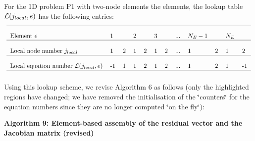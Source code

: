 For the 1\-D problem P1 with two-\/node elements the elements, the lookup table $ {\cal L}(j_{local},e)$ has the following entries\-: \[ \mbox{ \begin{tabular}{l l l l l l l l l l l l } \hline \\ \mbox{Element $e$} & 1 & & 2 & & 3 & & ... & $N_E-1$ & & $N_E$ & \\ \hline \\ \mbox{Local node number $j_{local}$} & 1 & 2 & 1 & 2 & 1 & 2 & ... & 1 & 2 & 1 & 2 \\ \hline \\ \mbox{Local equation number ${\cal L}(j_{local},e)$} & -1 & 1 & 1 & 2 & 1 & 2 & ... & 1 & 2 & 1 & -1\\ \hline \\ \end{tabular} } \] Using this lookup scheme, we revise Algorithm 6 as follows (only the highlighted regions have changed; we have removed the initialisation of the \char`\"{}counters\char`\"{} for the equation numbers since they are no longer computed \char`\"{}on the fly\char`\"{})\-:

\begin{center} {\bfseries  Algorithm 9\-: Element-\/based assembly of the residual vector and the Jacobian matrix (revised) } \end{center} 


